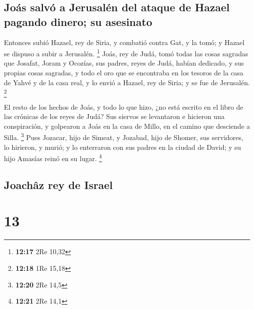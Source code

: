 \hypertarget{jouxe1s-salvuxf3-a-jerusaluxe9n-del-ataque-de-hazael-pagando-dinero-su-asesinato}{%
\subsection{Joás salvó a Jerusalén del ataque de Hazael pagando dinero;
su
asesinato}\label{jouxe1s-salvuxf3-a-jerusaluxe9n-del-ataque-de-hazael-pagando-dinero-su-asesinato}}

 Entonces subió Hazael, rey de Siria, y combatió contra
Gat, y la tomó; y Hazael se dispuso a subir a Jerusalén. \footnote{\textbf{12:17}
  2Re 10,32}  Joás, rey de Judá, tomó todas las cosas
sagradas que Josafat, Joram y Ocozías, sus padres, reyes de Judá, habían
dedicado, y sus propias cosas sagradas, y todo el oro que se encontraba
en los tesoros de la casa de Yahvé y de la casa real, y lo envió a
Hazael, rey de Siria; y se fue de Jerusalén. \footnote{\textbf{12:18}
  1Re 15,18}

 El resto de los hechos de Joás, y todo lo que hizo, ¿no
está escrito en el libro de las crónicas de los reyes de Judá?
 Sus siervos se levantaron e hicieron una conspiración, y
golpearon a Joás en la casa de Millo, en el camino que desciende a
Silla. \footnote{\textbf{12:20} 2Re 14,5}  Pues Jozacar,
hijo de Simeat, y Jozabad, hijo de Shomer, sus servidores, lo hirieron,
y murió; y lo enterraron con sus padres en la ciudad de David; y su hijo
Amasías reinó en su lugar. \footnote{\textbf{12:21} 2Re 14,1}

\hypertarget{joachuxe2z-rey-de-israel}{%
\subsection{Joachâz rey de Israel}\label{joachuxe2z-rey-de-israel}}

\hypertarget{section-12}{%
\section{13}\label{section-12}}

